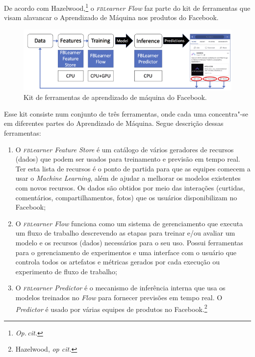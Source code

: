 De acordo com Hazelwood,\footnote{\textit{Op.\,cit.}} o \textit{\textsc{fbl}earner Flow} faz parte do kit de ferramentas que visam alavancar o Aprendizado de Máquina
nos produtos do Facebook.

\begin{figure}[!ht]
\includegraphics[width=\textwidth]{./imgs/grafico3.png}
\caption{\formular\footnotesize{Kit de ferramentas de aprendizado de máquina do Facebook.\protect\footnotemark}}
\end{figure}


Esse kit consiste num conjunto de três ferramentas, onde cada uma
concentra"-se em diferentes partes do Aprendizado de Máquina. Segue
descrição dessas ferramentas: 
\begin{enumerate}
\item O \textit{\textsc{fbl}earner Feature Store} é
um catálogo de vários geradores de recursos (dados) que podem ser usados
para treinamento e previsão em tempo real. Ter esta lista de recursos é
o ponto de partida para que as equipes comecem a usar o \textit{Machine
Learning}, além de ajudar a melhorar os modelos existentes com novos
recursos. Os dados são obtidos por meio das interações (curtidas,
comentários, compartilhamentos, fotos) que os usuários disponibilizam no
Facebook; 

\item O \textit{\textsc{fbl}earner Flow} funciona como um sistema de
gerenciamento que executa um fluxo de trabalho descrevendo as etapas
para treinar e/ou avaliar um modelo e os recursos (dados) necessários
para o seu uso. Possui ferramentas para o gerenciamento de experimentos
e uma interface com o usuário que controla todos os artefatos e métricas
gerados por cada execução ou experimento de fluxo de trabalho;

\item O \textit{\textsc{fbl}earner Predictor} é o mecanismo de inferência interna que
usa os modelos treinados no \textit{Flow} para fornecer previsões em
tempo real. O \textit{Predictor} é usado por várias equipes de
produtos no Facebook.\footnote{Hazelwood, \textit{op cit.}}
\end{enumerate}


